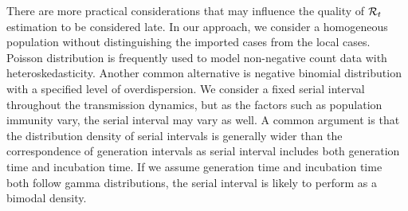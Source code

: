 


There are more practical considerations that may influence the quality of $\mathcal{R}_t$ estimation to be considered late. 
In our approach, we consider a homogeneous population without distinguishing the imported cases from the local cases. 
Poisson distribution is frequently used to model non-negative count data with heteroskedasticity. Another common alternative is negative binomial distribution with a specified level of overdispersion. 
% 
We consider a fixed serial interval throughout the transmission dynamics, but as the factors such as population immunity vary, the serial interval may vary as well. %
A common argument is that the distribution density of serial intervals is generally wider than the correspondence of generation intervals as serial interval includes both generation time and incubation time. If we assume generation time and incubation time both follow gamma distributions, the serial interval is likely to perform as a bimodal density. 

